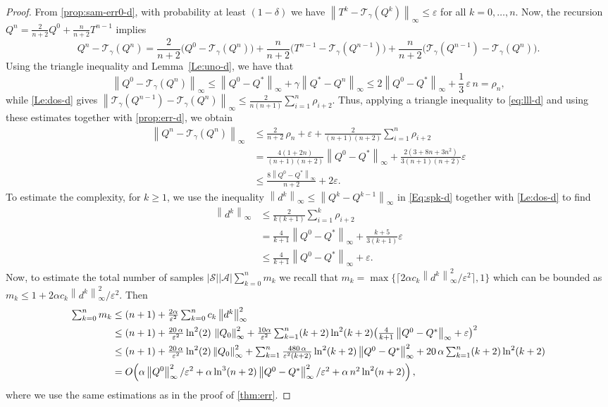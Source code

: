 \documentclass[10pt,a4paper]{amsart}
\newcommand{\T}{\mathcal{T}}
\newcommand{\cA}{\mathcal{A}}
\newcommand{\cS}{\mathcal{S}}
\newcommand*{\infn}[1]{\left\|{#1}\right\|_{\infty}}
\begin{document}
\begin{proof}
From \cref{prop:sam-err0-d}, with probability at least $(1-\delta)$ we have $\infn{T^k-\T_\gamma(Q^k)}\leq\varepsilon$ for all $k=0,\ldots,n$. Now, the recursion $Q^n=\frac{2}{n+2}Q^0+\frac{n}{n+2}T^{n-1}$ implies
 \begin{equation}\label{eq:lll-d}
    Q^n-\T_\gamma(Q^n)
    =\mbox{$\frac{2}{n+2}\big(Q^0-\T_\gamma(Q^n)\big)+ \frac{n}{n+2}\big(T^{n-1}-\T_\gamma(Q^{n-1})\big)+ \frac{n}{n+2} \big(\T_\gamma(Q^{n-1})-\T_\gamma(Q^n)\big)$}.
\end{equation}
Using the triangle inequality and Lemma~\ref{Le:uno-d}, we have that  
$$\infn{Q^0-\T_\gamma(Q^n)} \le \infn{Q^0-Q^*}+\gamma \infn{Q^*-Q^n} \le 2\infn{Q^0-Q^*}+\mbox{$\frac{1}{3}$}\,\varepsilon\,n =  \rho_n,$$ 
while \cref{Le:dos-d} gives $\infn{\T_\gamma(Q^{n-1})-\T_\gamma(Q^n)}\leq\frac{2}{n(n+1)}\sum_{i=1}^{n}\rho_{i+2}$. Thus, applying a triangle inequality to \eqref{eq:lll-d} and using these estimates together with \cref{prop:err-d}, we obtain 
\begin{align*}
    \infn{Q^n-\T_\gamma(Q^n)}&\le \mbox{$\frac{2}{n+2}\,\rho_n+ \varepsilon+\frac{2}{(n+1)(n+2)}\sum_{i=1}^{n}\rho_{i+2}$}
   \\& = \mbox{$\frac{4(1+2n)}{(n+1)(n+2)}\infn{Q^0-Q^*}+ \frac{2(3+8n+3n^2)}{3(n+1)(n+2)}\varepsilon$}
    \\& \le \mbox{$\frac{8\infn{Q^0-Q^*}}{n+2}+2\varepsilon$}.
\end{align*}
To estimate the complexity, for $k \ge 1$, we use the inequality $\infn{d^k}\le\infn{Q^k-Q^{k-1}}$ in \eqref{Eq:spk-d} together with \cref{Le:dos-d} to find
\begin{align*}
    \mbox{$\infn{d^k}$}&\leq\mbox{$\frac{2}{k(k+1)}\sum_{i=1}^{k}\rho_{i+2}$}\\
    &=\mbox{$\frac{4}{k+1}\infn{Q^0-Q^*}$} +\mbox{$\frac{k+5}{3(k+1)}\varepsilon$}\\
    &\leq \mbox{$\frac{4}{k+1}\infn{Q^0-Q^*}+\varepsilon$}.
\end{align*}
Now, to estimate the total number of samples $|\cS||\cA|\sum_{k=0}^n m_k$ 
we recall that $m_k=\max\{\lceil 2 \alpha c_k\infn{d^{k}}^2/\varepsilon^{2}\rceil,1\}$ which can be bounded as $m_k\leq 1+2\alpha c_k\infn{d^{k}}^2/\varepsilon^{2}$. Then 
\begin{align}
    \mbox{$\sum_{k=0}^nm_k$}&\leq\mbox{$ (n+1)+\frac{2\alpha}{\varepsilon^{2}}\sum_{k=0}^n c_k\infn{d^{k}}^2$} \nonumber\\
   &\leq\mbox{$ (n+1)+\frac{20\, \alpha}{\varepsilon^{2}} \ln^2(2)\,\infn{Q_0}^2+\frac{10\alpha}{\varepsilon^{2}}\sum_{k=1}^n (k+2)\ln^2(k+2)\big(\frac{4}{k+1}\infn{Q^0-Q^*}+\varepsilon\big)^2$} \nonumber\\
      &\leq\mbox{$ (n+1)+\frac{20\, \alpha}{\varepsilon^{2}} \ln^2(2)\infn{Q_0}^2+\sum_{k=1}^n\frac{480\,\alpha}{\varepsilon^{2}(k+2)}\ln^2(k+2)\infn{Q^0-Q^*}^2+20\,\alpha\sum_{k=1}^n(k+2)\ln^2(k+2)$} \nonumber\\
   &=O\!\left( \alpha \infn{Q^0}^2/\varepsilon^{2}+\mbox{$\alpha\ln^3(n+2)\infn{Q^0-Q^*}^2/\varepsilon^{2}+\alpha \,n^2\ln^2(n+2)$}\right),
   \label{eq:last-d}
\end{align}
where we use the same estimations as in the proof of \cref{thm:err}.
\end{proof}
\end{document}
